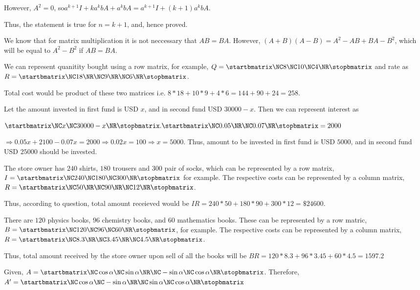   However, $A^2 = 0$, so$a^{k + 1}I + ka^kbA + a^kbA = a^{k + 1}I + (k + 1)a^kbA$.

  Thus, the statement is true for $n = k + 1$, and, hence proved.
\item We know that for matrix multiplication it is not neccessary that $AB = BA$. However, $(A + B)(A - B) =
  A^2 - AB + BA - B^2$, which will be equal to $A^2 - B^2$ if $AB = BA$.
\item We can represent quanitity bought using a row matrix, for example, $Q = \startbmatrix\NC 8\NC 10\NC
  4\NR\stopbmatrix$ and rate as $R = \startbmatrix\NC18\NR\NC 9\NR\NC 6\NR\stopbmatrix$.

  Total cost would be product of these two matrices i.e. $8*18 + 10*9 + 4*6 = 144 + 90 + 24 = 258$.
\item Let the amount invested in first fund is USD $x$, and in second fund USD $30000 - x$. Then we can
  represent interest as

  $\startbmatrix\NC x\NC 30000 - x\NR\stopbmatrix.\startbmatrix\NC 0.05\NR\NC 0.07\NR\stopbmatrix = 2000$

  $\Rightarrow 0.05x + 2100 - 0.07x = 2000 \Rightarrow 0.02x = 100 \Rightarrow x = 5000$. Thus, amount to be
  invested in first fund is USD $5000$, and in second fund USD $25000$ should be invested.
\item The store owner has $240$ shirts, $180$ trousers and $300$ pair of socks, which can be represented by
  a row matrix, $I = \startbmatrix\NC 240\NC 180\NC 300\NR\stopbmatrix$ for example. The respective costs
  can be represented by a column matrix, $R = \startbmatrix\NC 50\NR\NC 90\NR\NC 12\NR\stopbmatrix$.

  Thus, according to question, total amount receieved would be $IR = 240*50 + 180*90 + 300*12 = \$24600$.
\item There are $120$ physics books, $96$ chemistry books, and $60$ mathematics books. These can be
  represented by a row matric,$B = \startbmatrix\NC 120\NC 96\NC 60\NR\stopbmatrix$, for example. The
  respective costs can be represented by a column matrix, $R = \startbmatrix\NC 8.3\NR\NC 3.45\NR\NC
  4.5\NR\stopbmatrix$.

  Thus, total amount received by the store owner upon sell of all the books will be $BR = 120*8.3 + 96*3.45
  + 60*4.5 = 1597.2$
\item Given, $A = \startbmatrix\NC \cos\alpha \NC \sin\alpha \NR\NC -\sin\alpha \NC \cos
  \alpha\NR\stopbmatrix$. Therefore, $A' = \startbmatrix\NC\cos\alpha\NC -\sin\alpha\NR\NC \sin\alpha\NC
  \cos\alpha\NR\stopbmatrix$

